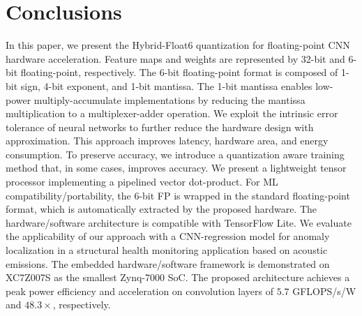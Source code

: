 \section{Conclusions}
\label{sec:conclusions}
In this paper, we present the Hybrid-Float6 quantization for floating-point CNN hardware acceleration. Feature maps and weights are represented by 32-bit and 6-bit floating-point, respectively. The 6-bit floating-point format is composed of 1-bit sign, 4-bit exponent, and 1-bit mantissa. The 1-bit mantissa enables low-power multiply-accumulate implementations by reducing the mantissa multiplication to a multiplexer-adder operation. We exploit the intrinsic error tolerance of neural networks to further reduce the hardware design with approximation. This approach improves latency, hardware area, and energy consumption. To preserve accuracy, we introduce a quantization aware training method that, in some cases, improves accuracy. We present a lightweight tensor processor implementing a pipelined vector dot-product. For ML compatibility/portability, the 6-bit FP is wrapped in the standard floating-point format, which is automatically extracted by the proposed hardware. The hardware/software architecture is compatible with TensorFlow Lite. We evaluate the applicability of our approach with a CNN-regression model for anomaly localization in a structural health monitoring application based on acoustic emissions. The embedded hardware/software framework is demonstrated on XC7Z007S as the smallest Zynq-7000 SoC. The proposed architecture achieves a peak power efficiency and acceleration on convolution layers of $5.7$ GFLOPS/s/W and $48.3\times$, respectively.